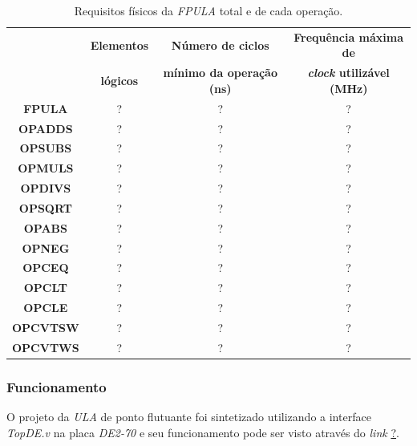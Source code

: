 \documentclass[12pt]{article}
\begin{document}

\begin{table}[H]
	\centering
	\begin{tabular}{|c|c|c|c|}
		\hline
		& \textbf{Elementos} & \textbf{Número de ciclos} & \textbf{Frequência máxima de} \\
		& \textbf{lógicos} & \textbf{mínimo da operação (ns)} & \textbf{\textit{clock} utilizável (MHz)} \\
		\hline
		\textbf{FPULA} & ? & ? & ? \\\hline
		\textbf{OPADDS} & ? & ? & ? \\\hline
		\textbf{OPSUBS} & ? & ? & ? \\\hline
		\textbf{OPMULS} & ? & ? & ? \\\hline
		\textbf{OPDIVS} & ? & ? & ? \\\hline
		\textbf{OPSQRT} & ? & ? & ? \\\hline
		\textbf{OPABS} & ? & ? & ? \\\hline
		\textbf{OPNEG} & ? & ? & ? \\\hline
		\textbf{OPCEQ} & ? & ? & ? \\\hline
		\textbf{OPCLT} & ? & ? & ? \\\hline
		\textbf{OPCLE} & ? & ? & ? \\\hline
		\textbf{OPCVTSW} & ? & ? & ? \\\hline
		\textbf{OPCVTWS} & ? & ? & ? \\\hline
	\end{tabular}
	\caption{Requisitos físicos da \textit{FPULA} total e de cada operação.}
	\label{tab:req3}
\end{table}

\subsubsection{Funcionamento}
\label{subsubsec:fpulafunc}

O projeto da \textit{ULA} de ponto flutuante foi sintetizado utilizando a interface \textit{TopDE.v} na placa \textit{DE2-70} e seu funcionamento pode ser visto através do \textit{link} \url{?}. 



\end{document}
